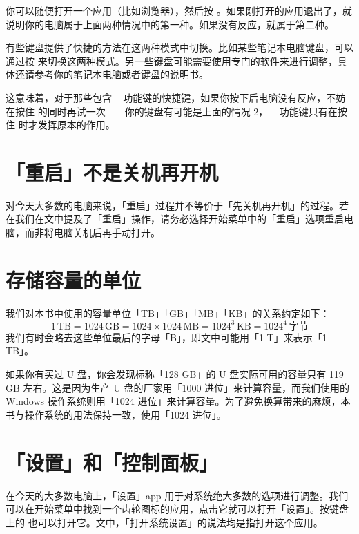 你可以随便打开一个应用（比如浏览器），然后按 。如果刚打开的应用退出了，就说明你的电脑属于上面两种情况中的第一种。如果没有反应，就属于第二种。

有些键盘提供了快捷的方法在这两种模式中切换。比如某些笔记本电脑键盘，可以通过按  来切换这两种模式。另一些键盘可能需要使用专门的软件来进行调整，具体还请参考你的笔记本电脑或者键盘的说明书。

\begin{note}
	这意味着，对于那些包含  --  功能键的快捷键，如果你按下后电脑没有反应，不妨在按住  的同时再试一次——你的键盘有可能是上面的情况 2， --  功能键只有在按住  时才发挥原本的作用。
\end{note}

\section{「重启」不是关机再开机}

对今天大多数的电脑来说，「重启」过程并不等价于「先关机再开机」的过程。若在我们在文中提及了「重启」操作，请务必选择开始菜单中的「重启」选项重启电脑，而非将电脑关机后再手动打开。

\section{存储容量的单位}

我们对本书中使用的容量单位「TB」「GB」「MB」「KB」的关系约定如下：
\[
  1\,\mathrm{TB}=1024\,\mathrm{GB}=1024\times1024\,\mathrm{MB}=1024^3\,\mathrm{KB}=1024^4\,\text{字节}
\]
我们有时会略去这些单位最后的字母「B」，即文中可能用「1 T」来表示「1 TB」。

\begin{note}
  如果你有买过 U 盘，你会发现标称「128 GB」的 U 盘实际可用的容量只有 119 GB 左右。这是因为生产 U 盘的厂家用「1000 进位」来计算容量，而我们使用的 Windows 操作系统则用「1024 进位」来计算容量。为了避免换算带来的麻烦，本书与操作系统的用法保持一致，使用「1024 进位」。
\end{note}

\section{「设置」和「控制面板」}

在今天的大多数电脑上，「设置」app 用于对系统绝大多数的选项进行调整。我们可以在开始菜单中找到一个齿轮图标的应用，点击它就可以打开「设置」。按键盘上的  也可以打开它。文中，「打开系统设置」的说法均是指打开这个应用。

